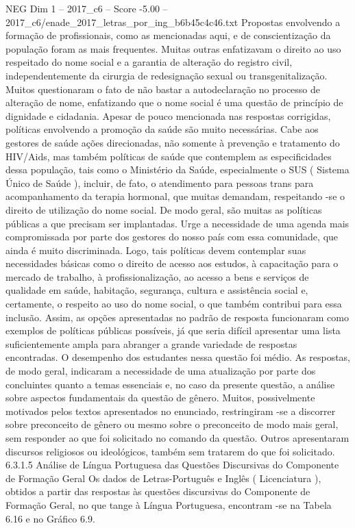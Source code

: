 \begin{textsample}{NEG Dim 1 – 2017\_c6 – Score -5.00 – 2017\_c6/enade\_2017\_letras\_por\_ing\_b6b45c4c46.txt}
Propostas envolvendo a formação de profissionais, como as mencionadas aqui, e de conscientização da população foram as mais frequentes.
Muitas outras enfatizavam o direito ao uso respeitado do nome social e a garantia de alteração do registro civil, independentemente da cirurgia de redesignação sexual ou transgenitalização.
Muitos questionaram o fato de não bastar a autodeclaração no processo de alteração de nome, enfatizando que o nome social é uma questão de princípio de dignidade e cidadania.
Apesar de pouco mencionada nas respostas corrigidas, políticas envolvendo a promoção da saúde são muito necessárias.
Cabe aos gestores de saúde ações direcionadas, não somente à prevenção e tratamento do HIV/Aids, mas também políticas de saúde que contemplem as especificidades dessa população, tais como o Ministério da Saúde, especialmente o SUS ( Sistema Único de Saúde ), incluir, de fato, o atendimento para pessoas trans para acompanhamento da terapia hormonal, que muitas demandam, respeitando -se o direito de utilização do nome social.
De modo geral, são muitas as políticas públicas a que precisam ser implantadas.
Urge a necessidade de uma agenda mais compromissada por parte dos gestores do nosso país com essa comunidade, que ainda é muito discriminada.
Logo, tais políticas devem contemplar suas necessidades básicas como o direito de acesso aos estudos, à capacitação para o mercado de trabalho, à profissionalização, ao acesso a bens e serviços de qualidade em saúde, habitação, segurança, cultura e assistência social e, certamente, o respeito ao uso do nome social, o que também contribui para essa inclusão.
Assim, as opções apresentadas no padrão de resposta funcionaram como exemplos de políticas públicas possíveis, já que seria difícil apresentar uma lista suficientemente ampla para abranger a grande variedade de respostas encontradas.
O desempenho dos estudantes nessa questão foi médio.
As respostas, de modo geral, indicaram a necessidade de uma atualização por parte dos concluintes quanto a temas essenciais e, no caso da presente questão, a análise sobre aspectos fundamentais da questão de gênero.
Muitos, possivelmente motivados pelos textos apresentados no enunciado, restringiram -se a discorrer sobre preconceito de gênero ou mesmo sobre o preconceito de modo mais geral, sem responder ao que foi solicitado no comando da questão.
Outros apresentaram discursos religiosos ou ideológicos, também sem tratarem do que foi solicitado. 6.3.1.5 Análise de Língua Portuguesa das Questões Discursivas do Componente de Formação Geral Os dados de Letras-Português e Inglês ( Licenciatura ), obtidos a partir das respostas às questões discursivas do Componente de Formação Geral, no que tange à Língua Portuguesa, encontram -se na Tabela 6.16 e no Gráfico 6.9.

\end{textsample}
